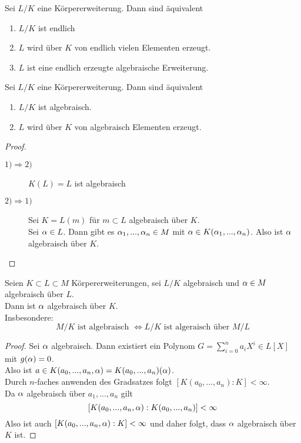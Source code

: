 	\begin{kor}
		Sei $L/K$ eine Körpererweiterung. Dann sind äquivalent
		\begin{enumerate}
			\item $L/K$ ist endlich
			\item $L$ wird über $K$ von endlich vielen Elementen erzeugt.
			\item $L$ ist eine endlich erzeugte algebraische Erweiterung.
		\end{enumerate}
	\end{kor}

	\begin{kor}
		Sei $L/K$ eine Körpererweiterung. Dann sind äquivalent
		\begin{enumerate}
			\item $L/K$ ist algebraisch.
			\item $L$ wird über $K$ von algebraisch Elementen erzeugt.
		\end{enumerate}
	\end{kor}
	\begin{proof}
		\begin{description}
			\item[$1)\Rightarrow2)$] $K(L)=L$ ist algebraisch
			\item[$2)\Rightarrow1)$] Sei $K=L(m)$ für $ m\subset L$ algebraisch über $K$.\\
			Sei $\alpha\in L$. Dann gibt es $\alpha_1,...,\alpha_n\in M$ mit $\alpha\in K(\alpha_1,...,\alpha_n)$. Also ist $\alpha$ algebraisch über $K$.
		\end{description}
	\end{proof}

	\begin{satz}
		Seien $K\subset L\subset M$ Körpererweiterungen, sei $L/K$ algebraisch und $\alpha\in M$ algebraisch über $L$.\\
		Dann ist $\alpha$ algebraisch über $K$.\\
		Insbesondere:
		\[\text{$M/K$ ist algebraisch }\Leftrightarrow\text{$L/K$ ist algeraisch über $M/L$}\]
	\end{satz}
	\begin{proof}
		Sei $\alpha$ algebraisch.  Dann existiert ein Polynom $G=\sum_{i=0}^{n}a_iX^i\in L[X]$ mit $g(\alpha)=0$.\\
		Also ist $a\in K(a_0,...,a_n,\alpha)=K(a_0,...,a_n)(\alpha)$.\\
		Durch $n$-faches anwenden des Gradsatzes folgt $[K(a_0,...,a_n):K]<\infty$.\\
		Da $\alpha$ algebraisch über $a_1,...,a_n$  gilt
		\[[K(a_0,...,a_n,\alpha):K(a_0,...,a_n)]<\infty\]
		Also ist auch $[K(a_0,...,a_n,\alpha):K]<\infty$ und daher folgt, dass $\alpha$ algebraisch über $K$ ist.
	\end{proof}
	

